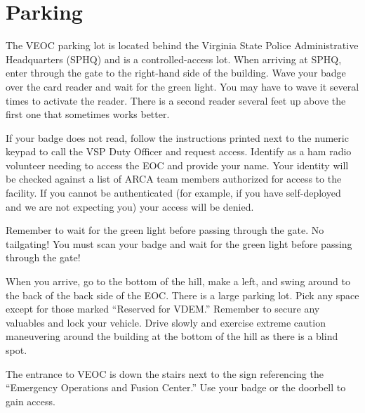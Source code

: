 \documentclass[pdflatex,letterpaper,twoside,12pt]{book}
\begin{document}

\section{Parking}

The VEOC parking lot is located behind the Virginia State Police Administrative Headquarters (SPHQ) and is a controlled-access lot.  When arriving at SPHQ, enter through the gate to the right-hand side of the building.  Wave your badge over the card reader and wait for the green light.  You may have to wave it several times to activate the reader.  There is a second reader several feet up above the first one that sometimes works better.

If your badge does not read, follow the instructions printed next to the numeric keypad to call the VSP Duty Officer and request access.  Identify as a ham radio volunteer needing to access the EOC and provide your name.  Your identity will be checked against a list of ARCA team members authorized for access to the facility.  If you cannot be authenticated (for example, if you have self-deployed and we are not expecting you) your access will be denied.

Remember to wait for the green light before passing through the gate.  No tailgating!  You must scan your badge and wait for the green light before passing through the gate!

When you arrive, go to the bottom of the hill, make a left, and swing around to the back of the back side of the EOC.  There is a large parking lot.  Pick any space except for those marked “Reserved for VDEM.”  Remember to secure any valuables and lock your vehicle.  Drive slowly and exercise extreme caution maneuvering around the building at the bottom of the hill as there is a blind spot.

The entrance to VEOC is down the stairs next to the sign referencing the ``Emergency Operations and Fusion Center.''  Use your badge or the doorbell to gain access.



\end{document}
